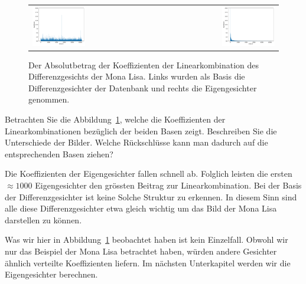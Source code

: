 \begin{figure}[ht]
	\centering
	\begin{tabular}{lr}
		\includegraphics[width=0.45\textwidth]{images/eigenfaces/naive_coef} & \includegraphics[width=0.45\textwidth]{images/eigenfaces/eigen_coef} \\
	\end{tabular}
	\caption{Der Absolutbetrag der Koeffizienten der Linearkombination des Differenzgesichts der Mona Lisa. Links wurden als Basis die Differenzgesichter der Datenbank und rechts die Eigengesichter genommen.}
	\label{fig:coef}
\end{figure}
\begin{aufgabe}
	Betrachten Sie die Abbildung~\ref{fig:coef}, welche die Koeffizienten der Linearkombinationen bezüglich der beiden Basen zeigt.
	Beschreiben Sie die Unterschiede der Bilder.
	Welche Rückschlüsse kann man dadurch auf die entsprechenden Basen ziehen?
\end{aufgabe}
\begin{losung*}
	Die Koeffizienten der Eigengesichter fallen schnell ab.
	Folglich leisten die ersten $\approx 1000$ Eigengesichter den grössten Beitrag zur Linearkombination.
	Bei der Basis der Differenzgesichter ist keine Solche Struktur zu erkennen.
	In diesem Sinn sind alle diese Differenzgesichter etwa gleich wichtig um das Bild der Mona Lisa darstellen zu können.
\end{losung*}
Was wir hier in Abbildung~\ref{fig:coef} beobachtet haben ist kein Einzelfall.
Obwohl wir nur das Beispiel der Mona Lisa betrachtet haben, würden andere Gesichter ähnlich verteilte Koeffizienten liefern.
Im nächsten Unterkapitel werden wir die Eigengesichter berechnen.
